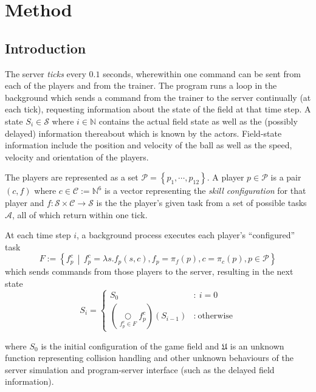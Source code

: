 \documentclass[10pt,a4paper]{article}
\begin{document}
\section{Method}

\subsection{Introduction}
The server \textit{ticks} every \(0.1\) seconds, wherewithin one command can be sent from each of the players and from the trainer. The program runs a loop in the background which sends a command from the trainer to the server continually (at each tick), requesting information about the state of the field at that time step. A state \(S_i \in \mathcal{S}\) where \(i \in \mathbb{N}\) contains the actual field state as well as the (possibly delayed) information thereabout which is known by the actors. Field-state information include the position and velocity of the ball as well as the speed, velocity and orientation of the players.

The players are represented as a set \(\mathcal{P}=\left\{p_1,\cdots,p_{12}\right\}\). A player \(p \in \mathcal{P}\) is a pair \((c, f)\) where \(c \in \mathcal{C} := \mathbb{N}^6\) is a vector representing the \textit{skill configuration} for that player and \(f : \mathcal{S}\times \mathcal{C} \to \mathcal{S}\) is the the player's given task from a set of possible tasks \(\mathcal{A}\), all of which return within one tick.

At each time step \(i\), a background process executes each player's ``configured'' task
\[
		F := \left\{ f_p^c \,\middle|\, f_p^c = \lambda s.f_p(s, c), f_p = \pi_f(p), c = \pi_c(p), p \in\mathcal{P} \right\}
\]
which sends commands from those players to the server, resulting in the next state 
\[
		S_{i} = \left\{
			\begin{array}{cl}
				S_0 & : \ i = 0 \\
					\left(\underset{f_p^c\in F}\bigcirc f_p^c\right)(S_{i-1}) & : \ \text{otherwise}
			\end{array}
		\right. %
\]

where \(S_0\) is the initial configuration of the game field and \(\mathfrak{U}\) is an unknown function representing collision handling and other unknown behaviours of the server simulation and program-server interface (such as the delayed field information). %
\end{document}
